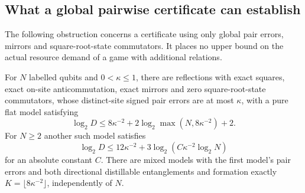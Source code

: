 \subsection{What a global pairwise certificate can establish}\label{sec:hash-frontier}
The following obstruction concerns a certificate using only global pair errors, mirrors and square-root-state commutators. It places no upper bound on the actual resource demand of a game with additional relations.

\begin{proposition}\label{prop:pairwise-hash}
For $N$ labelled qubits and $0<\kappa\le1$, there are reflections with exact squares, exact on-site anticommutation, exact mirrors and zero square-root-state commutators, whose distinct-site signed pair errors are at most $\kappa$, with a pure flat model satisfying
\[
 \log_2D\le8\kappa^{-2}+2\log_2\max(N,8\kappa^{-2})+2.
\]
For $N\ge2$ another such model satisfies
\[
 \log_2D\le12\kappa^{-2}+3\log_2(C\kappa^{-2}\log_2N)
\]
for an absolute constant $C$. There are mixed models with the first model's pair errors and both directional distillable entanglements and formation exactly $K=\lfloor8\kappa^{-2}\rfloor$, independently of $N$.
\end{proposition}
